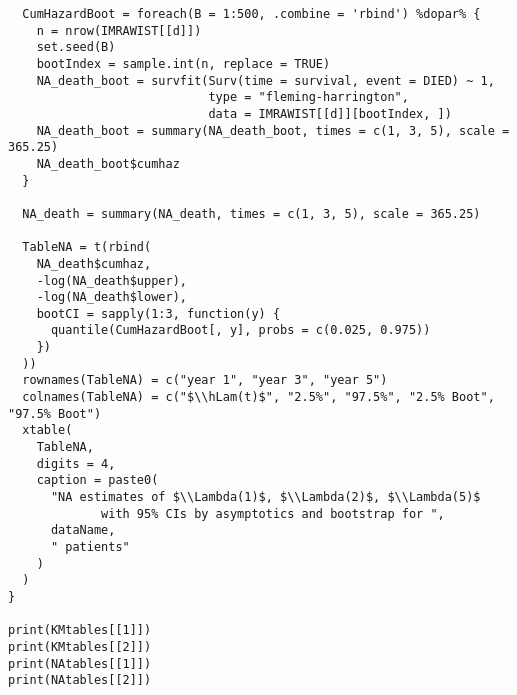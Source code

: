 \documentclass[11pt]{article}
\newcommand{\hLam}{\hat{\Lambda}}
\begin{document}
\begin{lstlisting}
  CumHazardBoot = foreach(B = 1:500, .combine = 'rbind') %dopar% {
    n = nrow(IMRAWIST[[d]])
    set.seed(B)
    bootIndex = sample.int(n, replace = TRUE)
    NA_death_boot = survfit(Surv(time = survival, event = DIED) ~ 1,
                            type = "fleming-harrington",
                            data = IMRAWIST[[d]][bootIndex, ])
    NA_death_boot = summary(NA_death_boot, times = c(1, 3, 5), scale = 365.25)
    NA_death_boot$cumhaz
  }
  
  NA_death = summary(NA_death, times = c(1, 3, 5), scale = 365.25)
  
  TableNA = t(rbind(
    NA_death$cumhaz,
    -log(NA_death$upper),
    -log(NA_death$lower),
    bootCI = sapply(1:3, function(y) {
      quantile(CumHazardBoot[, y], probs = c(0.025, 0.975))
    })
  ))
  rownames(TableNA) = c("year 1", "year 3", "year 5")
  colnames(TableNA) = c("$\\hLam(t)$", "2.5%", "97.5%", "2.5% Boot", "97.5% Boot")
  xtable(
    TableNA,
    digits = 4,
    caption = paste0(
      "NA estimates of $\\Lambda(1)$, $\\Lambda(2)$, $\\Lambda(5)$
             with 95% CIs by asymptotics and bootstrap for ",
      dataName,
      " patients"
    )
  )
}

print(KMtables[[1]])
print(KMtables[[2]])
print(NAtables[[1]])
print(NAtables[[2]])

\end{lstlisting}
\end{document}
